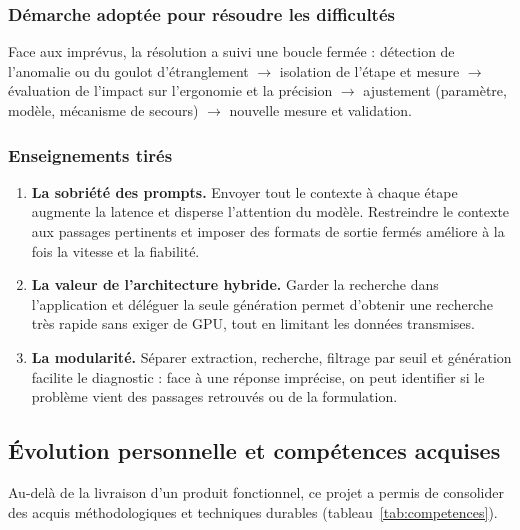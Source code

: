 \documentclass[12pt,a4paper,oneside]{report}
\begin{document}
\subsubsection*{Démarche adoptée pour résoudre les difficultés}

Face aux imprévus, la résolution a suivi une boucle fermée : détection de l'anomalie ou du goulot d'étranglement $\rightarrow$ isolation de l'étape et mesure $\rightarrow$ évaluation de l'impact sur l'ergonomie et la précision $\rightarrow$ ajustement (paramètre, modèle, mécanisme de secours) $\rightarrow$ nouvelle mesure et validation.

\subsubsection*{Enseignements tirés}

\begin{enumerate}
  \item \textbf{La sobriété des prompts.} Envoyer tout le contexte à chaque étape augmente la latence et disperse l'attention du modèle. Restreindre le contexte aux passages pertinents et imposer des formats de sortie fermés améliore à la fois la vitesse et la fiabilité.
  \item \textbf{La valeur de l'architecture hybride.} Garder la recherche dans l'application et déléguer la seule génération permet d'obtenir une recherche très rapide sans exiger de GPU, tout en limitant les données transmises.
  \item \textbf{La modularité.} Séparer extraction, recherche, filtrage par seuil et génération facilite le diagnostic : face à une réponse imprécise, on peut identifier si le problème vient des passages retrouvés ou de la formulation.
\end{enumerate}

\subsection{Évolution personnelle et compétences acquises}

Au-delà de la livraison d'un produit fonctionnel, ce projet a permis de consolider des acquis méthodologiques et techniques durables (tableau~\ref{tab:competences}).
\end{document}
